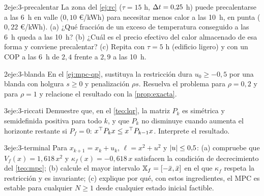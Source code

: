 \begin{ejercicio}{2}{eje:3-precalentar}
La zona del \cref{ej:rc} ($\tau=15$ h, $\Delta t=0{,}25$ h) puede precalentarse a las 6~h en valle ($0{,}10$ €/kWh) para necesitar menos calor a las 10~h, en punta ($0{,}22$ €/kWh). (a) ¿Qué fracción de un exceso de temperatura conseguido a las 6~h queda a las 10~h? (b) ¿Cuál es el precio efectivo del calor almacenado de esa forma y conviene precalentar? (c) Repita con $\tau=5$ h (edificio ligero) y con un COP a las 6~h de $2{,}4$ frente a $2{,}9$ a las 10~h.
\end{ejercicio}

\begin{ejercicio}{2}{eje:3-blanda}
En el \cref{ej:mpc-qp}, sustituya la restricción dura $u_0\ge-0{,}5$ por una blanda con holgura $s\ge0$ y penalización $\rho s$. Resuelva el problema para $\rho=0{,}2$ y para $\rho=1$ y relacione el resultado con la \cref{prop:exacta}.
\end{ejercicio}

\begin{ejercicio}{3}{eje:3-riccati}
Demuestre que, en el \cref{teo:lqr}, la matriz $P_k$ es simétrica y semidefinida positiva para todo $k$, y que $P_k$ no disminuye cuando aumenta el horizonte restante si $P_f=0$: $x^{\top} P_kx\le x^{\top} P_{k-1}x$. Interprete el resultado.
\end{ejercicio}

\begin{ejercicio}{3}{eje:3-terminal}
Para $x_{k+1}=x_k+u_k$, $\ell=x^{2}+u^{2}$ y $\lvert u\rvert\le0{,}5$: (a) compruebe que $V_f(x)=1{,}618\,x^{2}$ y $\kappa_f(x)=-0{,}618\,x$ satisfacen la condición de decrecimiento del \cref{teo:mpc}; (b) calcule el mayor intervalo $\mathbb{X}_f=[-\bar x,\bar x]$ en el que $\kappa_f$ respeta la restricción y es invariante; (c) explique por qué, con estos ingredientes, el MPC es estable para cualquier $N\ge1$ desde cualquier estado inicial factible.
\end{ejercicio}
